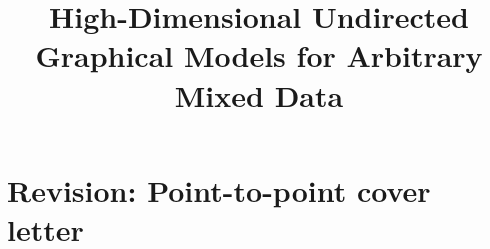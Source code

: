 \documentclass[ejs]{imsart}
\theoremstyle{plain}
\newcounter{reviewer}
\newcounter{point}[reviewer]
\begin{document}
\section*{Revision: Point-to-point cover letter}



\clearpage\newpage
\setcounter{page}{1}

\begin{frontmatter}

    \title{High-Dimensional Undirected Graphical Models for Arbitrary Mixed Data}

    \begin{aug}
        \author{ 
            }


        \address{Technical University of Munich, \\
            Robert Bosch GmbH \\
            }

        \author{ 
            }

        \address{German Center for Neurodegenerative Diseases (DZNE)\\
            Bonn, Germany\\
            }

        \author{ 
            }

        \address{Munich Center for Machine Learning, \\ Technical University of Munich \\
            }

        \author{ 
            }

        \address{German Center for Neurodegenerative Diseases (DZNE)\\
        Bonn, Germany, \\ [1em]
        University of Cambridge,
        MRC Biostatistics Unit \\
        }


    \end{aug}



\end{frontmatter}
\end{document}
